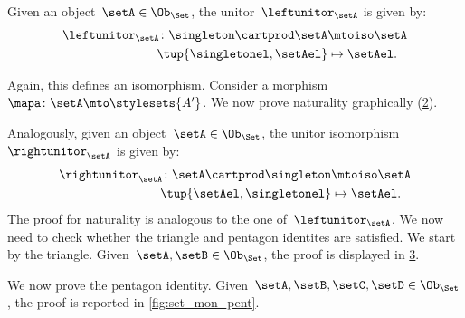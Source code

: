 \begin{example}
	\begin{figure}[h!]
		\centering
		\caption{}
		\label{fig:monoidal_set_ass_nat}
	\end{figure}

	Given an object~$\setA\in \Ob_\Set$, the unitor~$\leftunitor_\setA$ is given by:
	\begin{equation*}
		\label{eq:set_mon_prod_4}
		\begin{aligned}
			\leftunitor_\setA\colon \singleton \cartprod \setA & \mtoiso \setA    \\
			\tup{\singletonel,\setAel}                         & \mapsto \setAel.
		\end{aligned}
	\end{equation*}

	Again, this defines an isomorphism.
	Consider a morphism~$\mapa\colon \setA\mto \stylesets{A'}$.
	We now prove naturality graphically (\cref{fig:monoidal_set_unit_nat}).

	\begin{figure}[h!]
		\centering
		\caption{}
		\label{fig:monoidal_set_unit_nat}
	\end{figure}

	Analogously, given an object~$\setA\in \Ob_{\Set}$, the unitor isomorphism~$\rightunitor_\setA$ is given by:
	\begin{equation*}
		\label{eq:set_mon_prod_5}
		\begin{aligned}
			\rightunitor_\setA\colon \setA\cartprod \singleton & \mtoiso \setA    \\
			\tup{\setAel,\singletonel}                         & \mapsto \setAel.
		\end{aligned}
	\end{equation*}
	The proof for naturality is analogous to the one of~$\leftunitor_\setA$.
	We now need to check whether the triangle and pentagon identites are satisfied.
	We start by the triangle.
	Given~$\setA,\setB\in \Ob_{\Set}$, the proof is displayed in \cref{fig:set_mon_triangle}.

	\begin{figure}[h]
		\centering
		\caption{}
		\label{fig:set_mon_triangle}
	\end{figure}

	We now prove the pentagon identity.
	Given~$\setA,\setB,\setC,\setD\in \Ob_\Set$, the proof is reported in \cref{fig:set_mon_pent}.

	\begin{figure*}[h]
		\centering
		\caption{}
		\label{fig:set_mon_pent}
	\end{figure*}
\end{example}

